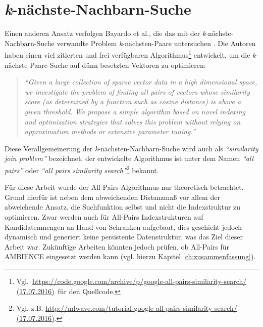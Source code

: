 \section{\textit{k}-nächste-Nachbarn-Suche}\label{sec:bloom-knn}
Einen anderen Ansatz verfolgen Bayardo et al., die das mit der \textit{k}-nächste-Nachbarn-Suche verwandte Problem \textit{k}-nächsten-Paare untersuchen \cite{Bayardo2007}. Die Autoren haben einen viel zitierten und frei verfügbaren Algorithmus\footnote{\mbox{Vgl. \url{https://code.google.com/archive/p/google-all-pairs-similarity-search/ (17.07.2016)} für} den Quell\-code.} entwickelt, um die \textit{k}-nächste-Paare-Suche auf dünn besetzten Vektoren zu optimieren: 
\begin{quote}
\textit{"`Given a large collection of sparse vector data in a high dimensional space, we investigate the problem of finding all pairs of vectors whose similarity score (as determined by a function such as cosine distance) is above a given threshold. We propose a simple algorithm based on novel indexing and optimization strategies that solves this problem without relying on approximation methods or extensive parameter tuning."'} \cite{Bayardo2007}
\end{quote}
Diese Verallgemeinerung der \textit{k}-nächsten-Nachbarn-Suche wird auch als \textit{"`similarity join problem"'} \cite{Bayardo2007} bezeichnet, der entwickelte Algorithmus ist unter dem Namen \textit{"`all pairs"'} oder \textit{"`all pairs similarity search"'}\footnote{Vgl. z.B. \url{http://mlwave.com/tutorial-google-all-pairs-similarity-search/ (17.07.2016)}.} bekannt. 

Für diese Arbeit wurde der All-Pairs-Algorithmus nur theoretisch betrachtet. Grund hierfür ist neben dem abweichenden Distanzmaß vor allem der abweichende Ansatz, die Suchfunktion selbst und nicht die Indexstruktur zu optimieren. Zwar werden auch für All-Pairs Indexstrukturen auf Kandidatenmengen an Hand von Schranken aufgebaut, dies geschieht jedoch dynamisch und generiert keine persistente Datenstruktur, was das Ziel dieser Arbeit war. Zukünftige Arbeiten könnten jedoch prüfen, ob All-Pairs für AMBIENCE eingesetzt werden kann (vgl. hierzu Kapitel \ref{ch:zusammenfassung}). 